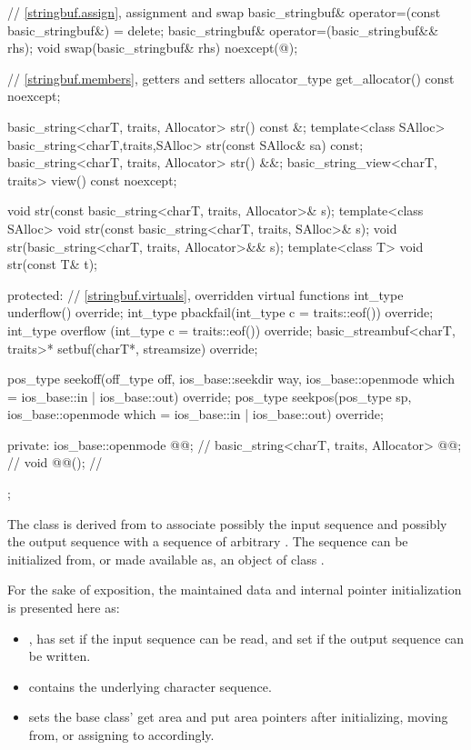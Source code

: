 \begin{codeblock}
{{    // \ref{stringbuf.assign}, assignment and swap
    basic_stringbuf& operator=(const basic_stringbuf&) = delete;
    basic_stringbuf& operator=(basic_stringbuf&& rhs);
    void swap(basic_stringbuf& rhs) noexcept(@\seebelow@);

    // \ref{stringbuf.members}, getters and setters
    allocator_type get_allocator() const noexcept;

    basic_string<charT, traits, Allocator> str() const &;
    template<class SAlloc>
      basic_string<charT,traits,SAlloc> str(const SAlloc& sa) const;
    basic_string<charT, traits, Allocator> str() &&;
    basic_string_view<charT, traits> view() const noexcept;

    void str(const basic_string<charT, traits, Allocator>& s);
    template<class SAlloc>
      void str(const basic_string<charT, traits, SAlloc>& s);
    void str(basic_string<charT, traits, Allocator>&& s);
    template<class T>
      void str(const T& t);

  protected:
    // \ref{stringbuf.virtuals}, overridden virtual functions
    int_type underflow() override;
    int_type pbackfail(int_type c = traits::eof()) override;
    int_type overflow (int_type c = traits::eof()) override;
    basic_streambuf<charT, traits>* setbuf(charT*, streamsize) override;

    pos_type seekoff(off_type off, ios_base::seekdir way,
                     ios_base::openmode which
                       = ios_base::in | ios_base::out) override;
    pos_type seekpos(pos_type sp,
                     ios_base::openmode which
                       = ios_base::in | ios_base::out) override;

  private:
    ios_base::openmode @@;                        // \expos
    basic_string<charT, traits, Allocator> @@;     // \expos
    void @@();                           // \expos
  };
}
\end{codeblock}

\pnum
The class
is derived from
to associate possibly the input sequence and possibly
the output sequence with a sequence of arbitrary
.
The sequence can be initialized from, or made available as, an object of class
.

\pnum
For the sake of exposition,
the maintained data and internal pointer initialization is presented here as:
\begin{itemize}
\item
  , has
   set if the input sequence can be read, and
   set if the output sequence can be written.
\item
  contains the underlying character sequence.
\item
   sets the base class'
  get area and
  put area pointers
  after initializing, moving from, or assigning to  accordingly.
\end{itemize}

